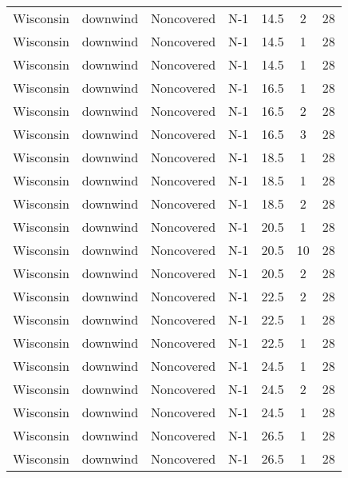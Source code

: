 \documentclass{article}
\begin{document}
\begin{longtable}[c]{ccccccc}
Wisconsin & downwind  & Noncovered & N-1             & 14.5         & 2           & 28  \\
Wisconsin & downwind  & Noncovered & N-1             & 14.5         & 1           & 28  \\
Wisconsin & downwind  & Noncovered & N-1             & 14.5         & 1           & 28  \\
Wisconsin & downwind  & Noncovered & N-1             & 16.5         & 1           & 28  \\
Wisconsin & downwind  & Noncovered & N-1             & 16.5         & 2           & 28  \\
Wisconsin & downwind  & Noncovered & N-1             & 16.5         & 3           & 28  \\
Wisconsin & downwind  & Noncovered & N-1             & 18.5         & 1           & 28  \\
Wisconsin & downwind  & Noncovered & N-1             & 18.5         & 1           & 28  \\
Wisconsin & downwind  & Noncovered & N-1             & 18.5         & 2           & 28  \\
Wisconsin & downwind  & Noncovered & N-1             & 20.5         & 1           & 28  \\
Wisconsin & downwind  & Noncovered & N-1             & 20.5         & 10          & 28  \\
Wisconsin & downwind  & Noncovered & N-1             & 20.5         & 2           & 28  \\
Wisconsin & downwind  & Noncovered & N-1             & 22.5         & 2           & 28  \\
Wisconsin & downwind  & Noncovered & N-1             & 22.5         & 1           & 28  \\
Wisconsin & downwind  & Noncovered & N-1             & 22.5         & 1           & 28  \\
Wisconsin & downwind  & Noncovered & N-1             & 24.5         & 1           & 28  \\
Wisconsin & downwind  & Noncovered & N-1             & 24.5         & 2           & 28  \\
Wisconsin & downwind  & Noncovered & N-1             & 24.5         & 1           & 28  \\
Wisconsin & downwind  & Noncovered & N-1             & 26.5         & 1           & 28  \\
Wisconsin & downwind  & Noncovered & N-1             & 26.5         & 1           & 28  \\

\end{longtable}
\end{document}
